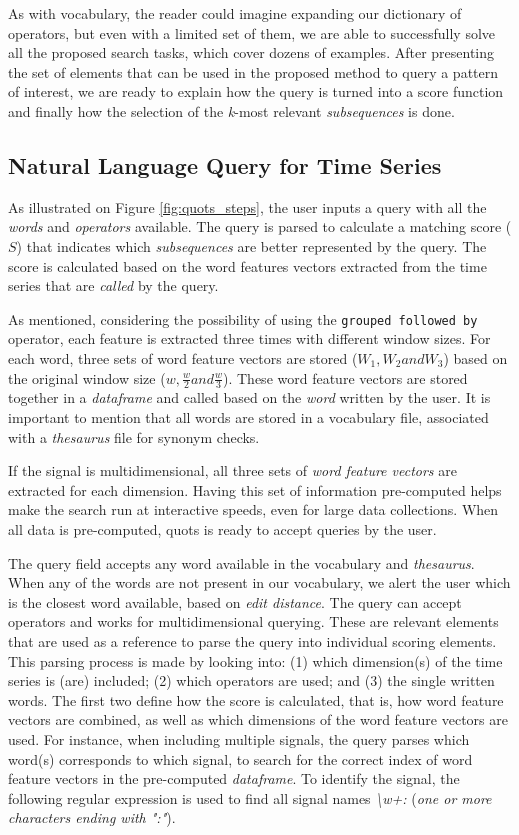 As with vocabulary, the reader could imagine expanding our dictionary of operators, but even with a limited set of them, we are able to successfully solve all the proposed search tasks, which cover dozens of examples. After presenting the set of elements that can be used in the proposed method to query a pattern of interest, we are ready to explain how the query is turned into a score function and finally how the selection of the \textit{k}-most relevant \textit{subsequences} is done. 

\subsection{Natural Language Query for Time Series}

As illustrated on Figure \ref{fig:quots_steps}, the user inputs a query with all the \textit{words} and \textit{operators} available. The query is parsed to calculate a matching score ($S$) that indicates which \textit{subsequences} are better represented by the query. The score is calculated based on the word features vectors extracted from the time series that are \textit{called} by the query.
\par
As mentioned, considering the possibility of using the \texttt{grouped followed by} operator, each feature is extracted three times with different window sizes. For each word, three sets of word feature vectors are stored ($W_1, W_2 and W_3$) based on the original window size ($w, \frac{w}{2} and \frac{w}{3}$). These word feature vectors are stored together in a \textit{dataframe} and called based on the \textit{word} written by the user. It is important to mention that all words are stored in a vocabulary file, associated with a \textit{thesaurus} file for synonym checks.
\par
If the signal is multidimensional, all three sets of \textit{word feature vectors} are extracted for each dimension. Having this set of information pre-computed helps make the search run at interactive speeds, even for large data collections. When all data is pre-computed, \gls{quots} is ready to accept queries by the user. 
\par
The query field accepts any word available in the vocabulary and \textit{thesaurus}. When any of the words are not present in our vocabulary, we alert the user which is the closest word available, based on \textit{edit distance}. The query can accept operators and works for multidimensional querying. These are relevant elements that are used as a reference to parse the query into individual scoring elements. This parsing process is made by looking into: (1) which dimension(s) of the time series is (are) included; (2) which operators are used; and (3) the single written words. The first two define how the score is calculated, that is, how word feature vectors are combined, as well as which dimensions of the word feature vectors are used. For instance, when including multiple signals, the query parses which word(s) corresponds to which signal, to search for the correct index of word feature vectors in the pre-computed \textit{dataframe}. To identify the signal, the following regular expression is used to find all signal names \textit{\textbackslash w+:} (\textit{one or more characters ending with ":"}).
